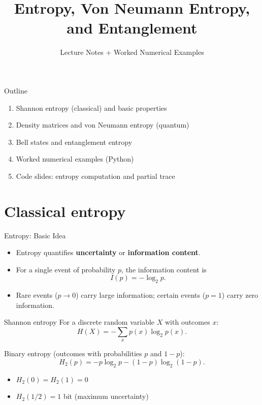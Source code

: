 \documentclass{beamer}
\title{Entropy, Von Neumann Entropy, and Entanglement}
\author{Lecture Notes + Worked Numerical Examples}
\date{}
\begin{document}
\begin{frame}
\titlepage
\end{frame}

\begin{frame}{Outline}
\begin{enumerate}
    \item Shannon entropy (classical) and basic properties
    \item Density matrices and von Neumann entropy (quantum)
    \item Bell states and entanglement entropy
    \item Worked numerical examples (Python)
    \item Code slides: entropy computation and partial trace
\end{enumerate}
\end{frame}

\section{Classical entropy}

\begin{frame}{Entropy: Basic Idea}
\begin{itemize}
    \item Entropy quantifies \textbf{uncertainty} or \textbf{information content}.
    \item For a single event of probability $p$, the information content is
    \[
    I(p) = -\log_2 p.
    \]
    \item Rare events ($p\to 0$) carry large information; certain events ($p=1$) carry zero information.
\end{itemize}
\end{frame}

\begin{frame}{Shannon entropy}
For a discrete random variable $X$ with outcomes $x$:
\[
H(X) = -\sum_x p(x)\log_2 p(x).
\]

Binary entropy (outcomes with probabilities $p$ and $1-p$):
\[
H_2(p) = -p\log_2 p - (1-p)\log_2(1-p).
\]

\begin{itemize}
    \item $H_2(0)=H_2(1)=0$
    \item $H_2(1/2)=1$ bit (maximum uncertainty)
\end{itemize}
\end{frame}
\end{document}
